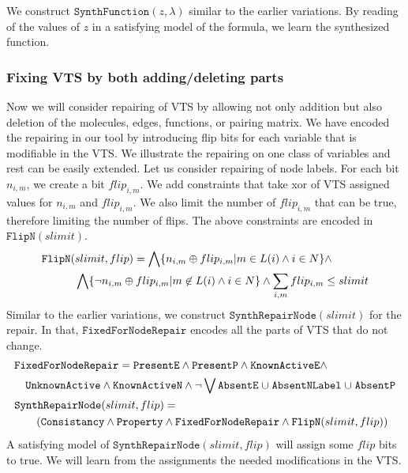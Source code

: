 We construct $\texttt{SynthFunction}(z,\lambda)$ similar to the earlier
variations.
%
By reading of the values of $z$ in a satisfying model of the formula,
we learn the synthesized function.

\subsubsection{Fixing VTS by both adding/deleting parts}
%
Now we will consider repairing of VTS by allowing not only addition but also
deletion of the molecules, edges, functions, or pairing matrix.
%
We have encoded the repairing in our tool by introducing flip bits
for each variable that is modifiable in the VTS.
%
We illustrate the repairing on one class of variables and rest can be
easily extended.
%
Let us consider repairing of node labels.
%
For each bit $n_{i,m}$, we create a bit $flip_{i,m}$.
%
We add constraints that take xor of VTS assigned values for  $n_{i,m}$
and $flip_{i,m}$.
%
We also limit the number of $flip_{i,m}$ that can be true, therefore
limiting the number of flips.
%
The above constraints are encoded in $\texttt{FlipN}(slimit)$.
\begin{align*}
&\texttt{FlipN}(slimit,flip) = \bigwedge \{n_{i,m}\oplus flip_{i,m}| m \in L(i) \land i \in N \} \land \\
& \quad \quad \quad
\bigwedge \{ \lnot n_{i,m}\oplus flip_{i,m}| m \not \in L(i) \land i \in N \} \land  \sum\limits_{i,m} flip_{i,m} \leq slimit
\end{align*}
%
Similar to the earlier variations, we construct
$\texttt{SynthRepairNode}(slimit)$ for the repair.
%
In that, $\texttt{FixedForNodeRepair}$ encodes all the parts of VTS that do not change.
\begin{align*}
& \texttt{FixedForNodeRepair} =  \texttt{PresentE} \land  
\texttt{PresentP} \land \texttt{KnownActiveE} 
\land \\
& \quad \texttt{UnknownActive} \land \texttt{KnownActiveN} \land \lnot 
\bigvee \texttt{AbsentE} \;{\cup}\; \texttt{AbsentNLabel} \;{\cup}\;
\texttt{AbsentP}\\
&\texttt{SynthRepairNode}(slimit,flip) = \\
& \quad\quad
(  \texttt{Consistancy}\land \texttt{Property} \land
\texttt{FixedForNodeRepair} \land \texttt{FlipN}(slimit,flip) )
\end{align*}
A satisfying model of $\texttt{SynthRepairNode}(slimit,flip)$ will assign some
$flip$ bits to true.
We will learn from the assignments the needed modifications in the VTS. 

               
